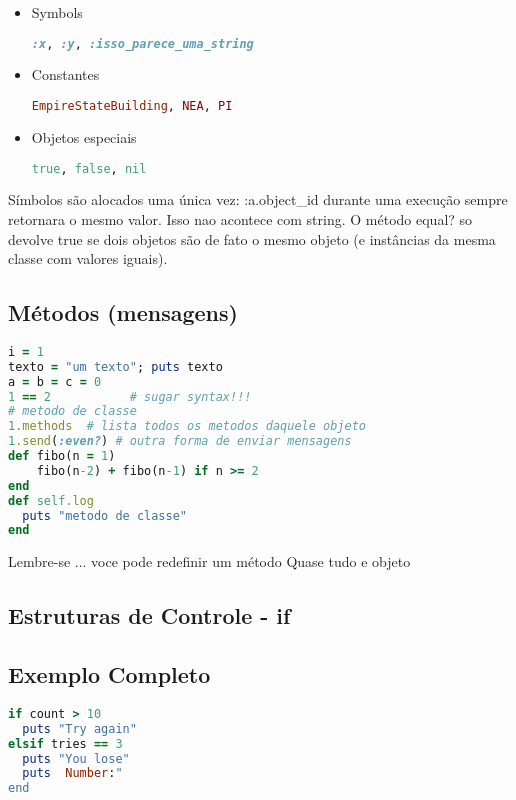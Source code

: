 \documentclass[serif,mathserif]{article}
\begin{document}
\begin{itemize}
  \item Symbols
\begin{lstlisting}[language=ruby]
:x, :y, :isso_parece_uma_string
\end{lstlisting}

  \item Constantes 
\begin{lstlisting}[language=ruby]  
EmpireStateBuilding, NEA, PI
\end{lstlisting}

  \item Objetos especiais 
\begin{lstlisting}[language=ruby]
true, false, nil
\end{lstlisting}
\end{itemize}

Símbolos são alocados uma única vez: :a.object\_id durante uma execução sempre
retornara o mesmo valor. Isso nao acontece com string. O método equal? so
devolve true se dois objetos são de fato o mesmo objeto (e instâncias da mesma
classe com valores iguais).

\subsection{Métodos (mensagens)}
\begin{lstlisting}[language=ruby]
i = 1        
texto = "um texto"; puts texto
a = b = c = 0
1 == 2           # sugar syntax!!!
# metodo de classe
1.methods  # lista todos os metodos daquele objeto
1.send(:even?) # outra forma de enviar mensagens
def fibo(n = 1)
    fibo(n-2) + fibo(n-1) if n >= 2
end
def self.log
  puts "metodo de classe"
end
\end{lstlisting}

Lembre-se ... voce pode redefinir um método
Quase tudo e objeto

\subsection{Estruturas de Controle - if}
 
       
\subsection {Exemplo Completo}
\begin{lstlisting}[language=ruby]
if count > 10
  puts "Try again"
elsif tries == 3
  puts "You lose"
  puts  Number:"
end
\end{lstlisting}
\end{document}
